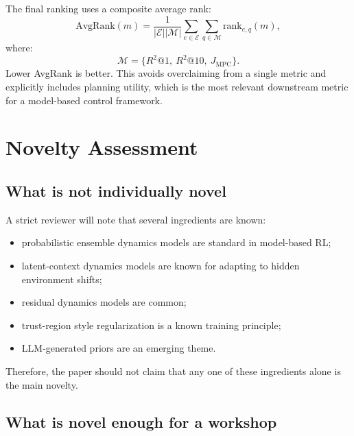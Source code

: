 \documentclass[11pt]{article}
\begin{document}
The final ranking uses a composite average rank:
\begin{equation}
    \mathrm{AvgRank}(m)
    =
    \frac{1}{|\mathcal{E}||\mathcal{M}|}
    \sum_{e\in\mathcal{E}}
    \sum_{q\in\mathcal{M}}
    \mathrm{rank}_{e,q}(m),
\end{equation}
where:
\begin{equation}
    \mathcal{M}
    =
    \{R^2@1,\ R^2@10,\ J_{\mathrm{MPC}}\}.
\end{equation}
Lower AvgRank is better. This avoids overclaiming from a single metric and explicitly includes planning utility, which is the most relevant downstream metric for a model-based control framework.

\section{Novelty Assessment}

\subsection{What is not individually novel}

A strict reviewer will note that several ingredients are known:
\begin{itemize}[leftmargin=1.5em]
    \item probabilistic ensemble dynamics models are standard in model-based RL;
    \item latent-context dynamics models are known for adapting to hidden environment shifts;
    \item residual dynamics models are common;
    \item trust-region style regularization is a known training principle;
    \item LLM-generated priors are an emerging theme.
\end{itemize}
Therefore, the paper should not claim that any one of these ingredients alone is the main novelty.

\subsection{What is novel enough for a workshop}
\end{document}
